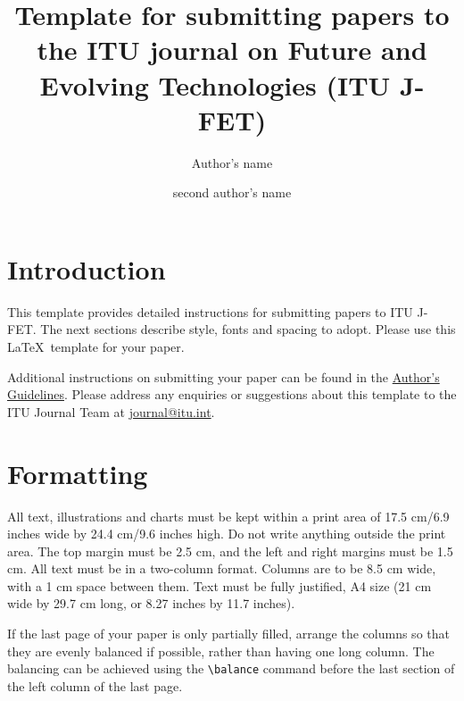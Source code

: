 \documentclass[a4paper,twocolumn]{article}
\title{Template for submitting papers to the ITU journal on Future and Evolving Technologies (ITU J-FET)}
\author[1]{\normalsize{Author's name}}
\author[2]{\normalsize{second author's name}}
\affil[1]{\normalsize{First author's affiliation and full address}}
\affil[2]{\normalsize{Second author's affiliation and full address, etc.}}
\begin{document}

\setcounter{page}{1}

\section{Introduction} 
\label{sec:intro}
This template provides detailed instructions for submitting papers to ITU J-FET. The next sections describe style, fonts and spacing to adopt. Please use this \LaTeX\ template for your paper. 

Additional instructions on submitting your paper can be found in the \href{https://www.itu.int/en/journal/Pages/submission-guidelines.aspx}{Author's Guidelines}. Please address any enquiries or suggestions about this template to the ITU Journal Team at \href{mailto:journal@itu.int}{journal@itu.int}.


\section{Formatting}
\label{sec:sec2}
All text, illustrations and charts must be kept within a print area of 17.5 cm/6.9 inches wide by 24.4 cm/9.6 inches high.
Do not write anything outside the print area.
The top margin must be 2.5 cm, and the left and right margins must be 1.5 cm.
All text must be in a two-column format.
Columns are to be 8.5 cm wide, with a 1 cm space between them.
Text must be fully justified, A4 size (21 cm wide by 29.7 cm long, or 8.27 inches by 11.7 inches).

If the last page of your paper is only partially filled, arrange the columns so that they are evenly balanced if possible, rather than having one long column.
The balancing can be achieved using the \texttt{\textbackslash balance} command before the last section of the left column of the last page.
\end{document}
